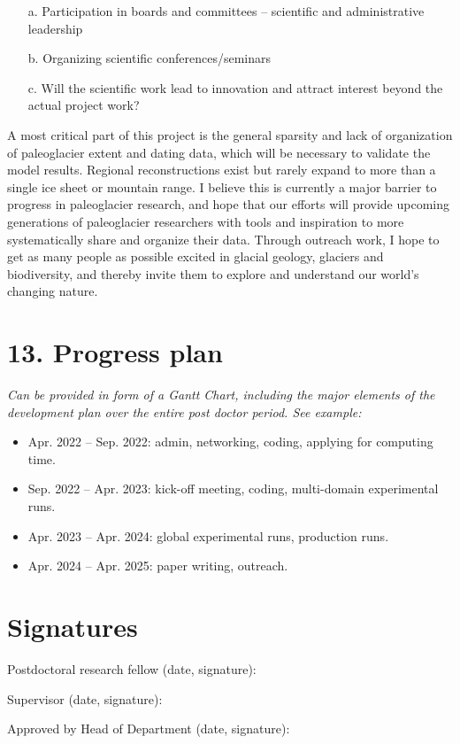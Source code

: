 \documentclass{article}
\newcommand{\guideline}[1]{{\color{color2}\itshape{#1}}}
\begin{document}
    \guideline{
        \begin{itemize}
          \item[a.] Participation in boards and committees – scientific and
            administrative leadership
          \item[b.] Organizing scientific conferences/seminars
          \item[c.] Will the scientific work lead to innovation and attract
            interest beyond the actual project work?
        \end{itemize}}

    A most critical part of this project is the general sparsity and lack of
    organization of paleoglacier extent and dating data, which will be
    necessary to validate the model results. Regional reconstructions exist but
    rarely expand to more than a single ice sheet or mountain range. I believe
    this is currently a major barrier to progress in paleoglacier research, and
    hope that our efforts will provide upcoming generations of paleoglacier
    researchers with tools and inspiration to more systematically share and
    organize their data. Through outreach work, I hope to get as many people
    as possible excited in glacial geology, glaciers and biodiversity, and
    thereby invite them to explore and understand our world's changing nature.


\section{13. Progress plan}

    \guideline{
        Can be provided in form of a Gantt Chart, including the major elements
        of the development plan over the entire post doctor period. See
        example:}

    \begin{itemize}
      \item Apr. 2022 -- Sep. 2022: admin, networking, coding, applying for
        computing time.
      \item Sep. 2022 -- Apr. 2023: kick-off meeting, coding, multi-domain
        experimental runs.
      \item Apr. 2023 -- Apr. 2024: global experimental runs, production runs.
      \item Apr. 2024 -- Apr. 2025: paper writing, outreach.
    \end{itemize}

\section{Signatures}

    Postdoctoral research fellow (date, signature):

    Supervisor (date, signature):

    Approved by Head of Department (date, signature):


\end{document}

